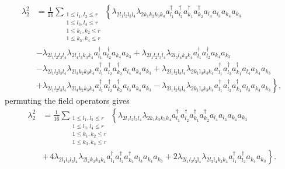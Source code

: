\documentclass[aps,preprint]{revtex4}%
\begin{document}
\begin{align}
\lambda_{2}^{2}  &  =\frac{1}{16}\sum_{\substack{1\leq l_{1},l_{2}\leq
r\\1\leq l_{3},l_{4}\leq r\\1\leq k_{1},k_{2}\leq r\\1\leq k_{3},k_{4}\leq
r}}\left\{  \lambda_{2l_{1}l_{2}l_{3}l_{4}}\lambda_{2k_{1}k_{2}k_{3}k_{4}%
}a_{l_{1}}^{\dagger}a_{l_{2}}^{\dagger}a_{k_{1}}^{\dagger}a_{k_{2}}^{\dagger
}a_{l_{4}}a_{l_{3}}a_{k_{4}}a_{k_{3}}\right. \nonumber\\
&  -\lambda_{2l_{1}l_{2}l_{3}l_{4}}\lambda_{2l_{4}l_{3}k_{3}k_{4}}a_{l_{1}%
}^{\dagger}a_{l_{2}}^{\dagger}a_{k_{4}}a_{k_{3}}+\lambda_{2l_{1}l_{2}%
l_{3}l_{4}}\lambda_{2l_{3}l_{4}k_{3}k_{4}}a_{l_{1}}^{\dagger}a_{l_{2}%
}^{\dagger}a_{k_{4}}a_{k_{3}}\nonumber\\
&  -\lambda_{2l_{1}l_{2}\mathrm{l}_{3}l_{4}}\lambda_{2\mathrm{l}_{3}k_{2}%
k_{3}k_{4}}a_{l_{1}}^{\dagger}a_{l_{2}}^{\dagger}a_{k_{2}}^{\dagger}a_{l_{4}%
}a_{k_{4}}a_{k_{3}}+\lambda_{2l_{1}l_{2}\mathrm{l}_{3}l_{4}}\lambda
_{2k_{1}\mathrm{l}_{3}k_{3}k_{4}}a_{l_{1}}^{\dagger}a_{l_{2}}^{\dagger
}a_{k_{1}}^{\dagger}a_{l_{4}}a_{k_{4}}a_{k_{3}}\nonumber\\
&  \left.  +\lambda_{2l_{1}l_{2}l_{3}\mathrm{l}_{4}}\lambda_{2\mathrm{l}%
_{4}k_{2}k_{3}k_{4}}a_{l_{1}}^{\dagger}a_{l_{2}}^{\dagger}a_{k_{2}}^{\dagger
}a_{l_{3}}a_{k_{4}}a_{k_{3}}-\lambda_{2l_{1}l_{2}l_{3}\mathrm{l}_{4}}%
\lambda_{2k_{1}\mathrm{l}_{4}k_{3}k_{4}}a_{l_{1}}^{\dagger}a_{l_{2}}^{\dagger
}a_{k_{1}}^{\dagger}a_{l_{3}}a_{k_{4}}a_{k_{3}}\right\}  ,
\end{align}
permuting the field operators gives%
\begin{align}
\lambda_{2}^{2}  &  =\frac{1}{16}\sum_{\substack{1\leq l_{1},l_{2}\leq
r\\1\leq l_{3},l_{4}\leq r\\1\leq k_{1},k_{2}\leq r\\1\leq k_{3},k_{4}\leq
r}}\left\{  \lambda_{2l_{1}l_{2}l_{3}l_{4}}\lambda_{2k_{1}k_{2}k_{3}k_{4}%
}a_{l_{1}}^{\dagger}a_{l_{2}}^{\dagger}a_{k_{1}}^{\dagger}a_{k_{2}}^{\dagger
}a_{l_{4}}a_{l_{3}}a_{k_{4}}a_{k_{3}}\right. \nonumber\\
&  \left.  +\,4\lambda_{2l_{1}l_{2}l_{3}\mathrm{l}_{4}}\lambda_{2\mathrm{l}%
_{4}k_{2}k_{3}k_{4}}a_{l_{1}}^{\dagger}a_{l_{2}}^{\dagger}a_{k_{2}}^{\dagger
}a_{l_{3}}a_{k_{4}}a_{k_{3}}+2\lambda_{2l_{1}l_{2}l_{3}\mathrm{l}_{4}}%
\lambda_{2l_{3}\mathrm{l}_{4}k_{3}k_{4}}a_{l_{1}}^{\dagger}a_{l_{2}}^{\dagger
}a_{k_{4}}a_{k_{3}}\right\}  .
\end{align}
\end{document}
